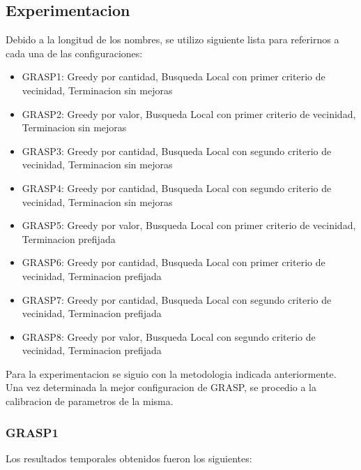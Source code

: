 \subsection{Experimentacion}

Debido a la longitud de los nombres, se utilizo siguiente lista para referirnos a cada una de las configuraciones:

\begin{itemize}
	\item GRASP1: Greedy por cantidad, Busqueda Local con primer criterio de vecinidad, Terminacion sin mejoras
	\item GRASP2: Greedy por valor, Busqueda Local con primer criterio de vecinidad, Terminacion sin mejoras
	\item GRASP3: Greedy por cantidad, Busqueda Local con segundo criterio de vecinidad, Terminacion sin mejoras
	\item GRASP4: Greedy por cantidad, Busqueda Local con segundo criterio de vecinidad, Terminacion sin mejoras
	\item GRASP5: Greedy por valor, Busqueda Local con primer criterio de vecinidad, Terminacion prefijada
	\item GRASP6: Greedy por cantidad, Busqueda Local con primer criterio de vecinidad, Terminacion prefijada
	\item GRASP7: Greedy por cantidad, Busqueda Local con segundo criterio de vecinidad, Terminacion prefijada
	\item GRASP8: Greedy por valor, Busqueda Local con segundo criterio de vecinidad, Terminacion prefijada
\end{itemize}

Para la experimentacion se siguio con la metodologia indicada anteriormente. Una vez determinada la mejor configuracion de GRASP, se procedio a la calibracion de parametros de la misma.

\newpage
\subsubsection{GRASP1}

Los resultados temporales obtenidos fueron los siguientes:

